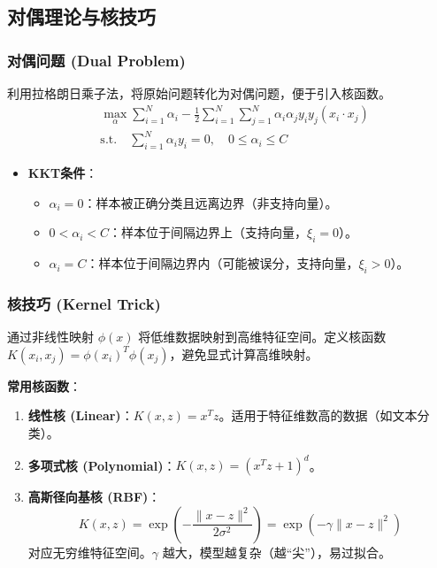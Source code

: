 \documentclass[a4paper, 11pt]{ctexart}
\begin{document}
\subsection{对偶理论与核技巧}
\subsubsection{对偶问题 (Dual Problem)}
利用拉格朗日乘子法，将原始问题转化为对偶问题，便于引入核函数。
\begin{equation}
    \begin{aligned}
    & \max_{\alpha} \sum_{i=1}^N \alpha_i - \frac{1}{2} \sum_{i=1}^N \sum_{j=1}^N \alpha_i \alpha_j y_i y_j (x_i \cdot x_j) \\
    & \text{s.t.} \quad \sum_{i=1}^N \alpha_i y_i = 0, \quad 0 \le \alpha_i \le C
    \end{aligned}
\end{equation}
\begin{itemize}
    \item \textbf{KKT条件}：
    \begin{itemize}
        \item $\alpha_i = 0$：样本被正确分类且远离边界（非支持向量）。
        \item $0 < \alpha_i < C$：样本位于间隔边界上（支持向量，$\xi_i=0$）。
        \item $\alpha_i = C$：样本位于间隔边界内（可能被误分，支持向量，$\xi_i > 0$）。
    \end{itemize}
\end{itemize}

\subsubsection{核技巧 (Kernel Trick)}
通过非线性映射 $\phi(x)$ 将低维数据映射到高维特征空间。定义核函数 $K(x_i, x_j) = \phi(x_i)^T \phi(x_j)$，避免显式计算高维映射。

\textbf{常用核函数}：
\begin{enumerate}
    \item \textbf{线性核 (Linear)}：$K(x, z) = x^T z$。适用于特征维数高的数据（如文本分类）。
    \item \textbf{多项式核 (Polynomial)}：$K(x, z) = (x^T z + 1)^d$。
    \item \textbf{高斯径向基核 (RBF)}：
    \begin{equation}
        K(x, z) = \exp\left( -\frac{\|x - z\|^2}{2\sigma^2} \right) = \exp(-\gamma \|x - z\|^2)
    \end{equation}
    对应无穷维特征空间。$\gamma$ 越大，模型越复杂（越“尖”），易过拟合。
\end{enumerate}
\end{document}

